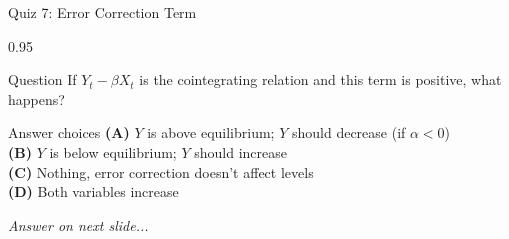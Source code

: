 \documentclass[9pt, aspectratio=169, t]{beamer}
\begin{document}
\begin{frame}{Quiz 7: Error Correction Term}
    \begin{cminipage}{0.95\textwidth}
    \begin{alertblock}{Question}
        If $Y_t - \beta X_t$ is the cointegrating relation and this term is positive, what happens?
    \end{alertblock}

    \vspace{0.4cm}

    \begin{block}{Answer choices}
        \textcolor{MainBlue}{\textbf{(A)}} $Y$ is above equilibrium; $Y$ should decrease (if $\alpha < 0$)\\[3pt]
        \textcolor{MainBlue}{\textbf{(B)}} $Y$ is below equilibrium; $Y$ should increase\\[3pt]
        \textcolor{MainBlue}{\textbf{(C)}} Nothing, error correction doesn't affect levels\\[3pt]
        \textcolor{MainBlue}{\textbf{(D)}} Both variables increase
    \end{block}

    \vspace{0.5cm}

    \begin{center}
        \textit{Answer on next slide...}
    \end{center}
    \end{cminipage}
\end{frame}
\end{document}
